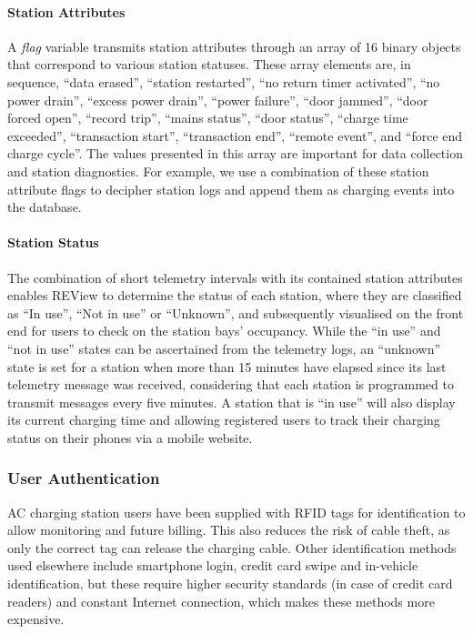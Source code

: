 \paragraph{Station Attributes}A \textit{flag} variable transmits station attributes through an array of 16 binary objects that correspond to various station statuses. These array elements are, in sequence, “data erased”, “station restarted”, “no return timer activated”, “no power drain”, “excess power drain”, “power failure”, “door jammed”, “door forced open”, “record trip”, “mains status”, “door status”, “charge time exceeded”, “transaction start”, “transaction end”, “remote event”, and “force end charge cycle”. The values presented in this array are important for data collection and station diagnostics. For example, we use a combination of these station attribute flags to decipher station logs and append them as charging events into the database.

\paragraph{Station Status} The combination of short telemetry intervals with its contained station attributes enables REView to determine the status of each station, where they are classified as “In use”, “Not in use” or “Unknown”, and subsequently visualised on the front end for users to check on the station bays’ occupancy. While the “in use” and “not in use” states can be ascertained from the telemetry logs, an “unknown” state is set for a station when more than 15 minutes have elapsed since its last telemetry message was received, considering that each station is programmed to transmit messages every five minutes. A station that is “in use” will also display its current charging time and allowing registered users to track their charging status on their phones via a mobile website.

\subsubsection{User Authentication}
AC charging station users have been supplied with RFID tags for identification to allow monitoring and future billing. This also reduces the risk of cable theft, as only the correct tag can release the charging cable. Other identification methods used elsewhere include smartphone login, credit card swipe and in-vehicle identification, but these require higher security standards (in case of credit card readers) and constant Internet connection, which makes these methods more expensive.

